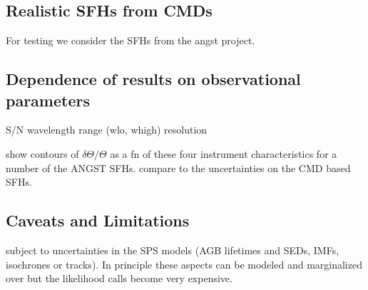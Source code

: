 \subsection{Realistic SFHs from CMDs}
For testing we consider the SFHs from the angst project. 

\subsection{Dependence of results on observational parameters}
S/N
wavelength range (wlo, whigh)
resolution

show contours of $\delta \Theta/\Theta$ as a fn of these four instrument characteristics for a number of the ANGST SFHs.  compare to the uncertainties on the CMD based SFHs.

\subsection{Caveats and Limitations}
subject to uncertainties in the SPS models (AGB lifetimes and SEDs, IMFs, isochrones or tracks).  In principle these aspects can be modeled and marginalized over \citep{conroy09} but the likelihood calls become very expensive.